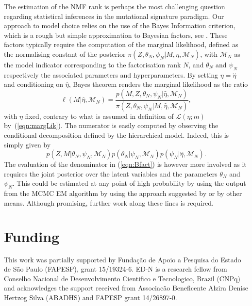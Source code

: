 \documentclass{bioinfo}
\newcommand{\Mord}{\mathcal{M}_N}
\begin{document}
The estimation of the NMF rank is perhaps the most challenging
question regarding statistical inferences in the mutational signature
paradigm. Our approach to model choice relies on the use of the Bayes
Information criterion, which is a rough but simple approximation to
Bayesian factors, see \cite{KR}. These factors typically require the
computation of the marginal likelihood, defined as the normalising
constant of the posterior $\pi(Z, \theta_N, \psi_N|M, \eta, \Mord)$,
with $\Mord$ as the model indicator corresponding to the factorisation
rank $N$, and $\theta_N$ and $\psi_N$ respectively the associated
parameters and hyperparameters. By setting $\eta = \hat\eta$ and
conditioning on $\hat\eta$, Bayes theorem renders the marginal
likelihood as the ratio
\begin{equation}
  \label{eqn:Bfact}
   \ell(M|\hat \eta, \Mord) 
  = 
    \frac{p(M, Z, \theta_N, \psi_N|\hat\eta, \Mord)}
    {\pi(Z, \theta_N, \psi_N|M, \hat\eta, \Mord)},
\end{equation}
with $\eta$ fixed, contrary to what is assumed in definition of
$\mathcal L(\eta; m)$ by~(\ref{eqn:margLik}). The numerator is easily
computed by observing the conditional decomposition defined by the
hierarchical model. Indeed, this is simply given by
\[
  p(Z, M|\theta_N, \psi_N, \Mord) p(\theta_N|\psi_N, \Mord)
  p(\psi_N|\hat\eta, \Mord).
\]
The evaluation of the denominator in (\ref{eqn:Bfact}) is however more
involved as it requires the joint posterior over the latent variables
and the parameters $\theta_N$ and $\psi_N$. This could be estimated at
any point of high probability by using the output from the MCMC EM
algorithm by using the approach suggested by \cite{Ch} or by other
means. Although promising, further work along these lines is
required.

\section*{Funding}
This work was partially supported by Funda\c{c}\~ao de Apoio a
Pesquisa do Estado de S\~ao Paulo (FAPESP), grant 15/19324-6. ED-N is
a research fellow from Conselho Nacional de Desenvolvimento Cientifico
e Tecnologico, Brazil (CNPq) and acknowledges the support received
from Associac\~ao Beneficente Alzira Denise Hertzog Silva (ABADHS) and 
FAPESP grant 14/26897-0.

 

\end{document}
